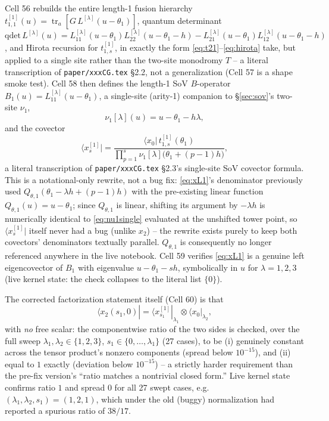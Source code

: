 \documentclass[11pt]{article}
\newcommand{\qthone}{Q_{\theta,1}}
\begin{document}
Cell 56 rebuilds the entire length-1 fusion hierarchy $t_{1,1}^{[1]}(u)=\operatorname{tr}_a[G\,
L^{[\lambda]}(u-\theta_1)]$, quantum determinant $\mathrm{qdet}\,L^{[\lambda]}(u) =
L^{[\lambda]}_{11}(u-\theta_1)L^{[\lambda]}_{22}(u-\theta_1-h) -
L^{[\lambda]}_{21}(u-\theta_1)L^{[\lambda]}_{12}(u-\theta_1-h)$, and Hirota recursion for
$t_{1,s}^{[1]}$, in exactly the form \eqref{eq:t21}--\eqref{eq:hirota} take, but applied to a single
site rather than the two-site monodromy $T$ -- a literal transcription of
\texttt{paper/xxxCG.tex} \S2.2, not a generalization (Cell 57 is a shape smoke test). Cell 58 then
defines the length-1 SoV $B$-operator $B_1(u)=L^{[\lambda]}_{11}(u-\theta_1)$, a single-site
(arity-1) companion to \S\ref{sec:sov}'s two-site $\nu_1$,
\begin{equation}
  \nu_1[\lambda](u) = u-\theta_1-h\lambda,
  \label{eq:nu1single}
\end{equation}
and the covector
\begin{equation}
  \langle x^{[1]}_s| = \frac{\langle x_0|\,t_{1,s}^{[1]}(\theta_1)}{\prod_{p=1}^{s}\nu_1[\lambda]\bigl(\theta_1+(p-1)h\bigr)},
  \label{eq:xL1}
\end{equation}
a literal transcription of \texttt{paper/xxxCG.tex} \S2.3's single-site SoV covector formula. This
is a notational-only rewrite, not a bug fix: \eqref{eq:xL1}'s denominator previously used
$\qthone(\theta_1-\lambda h+(p-1)h)$ with the pre-existing linear function $\qthone(u)=u-\theta_1$;
since $\qthone$ is linear, shifting its argument by $-\lambda h$ is numerically identical to
\eqref{eq:nu1single} evaluated at the unshifted tower point, so $\langle x^{[1]}_s|$ itself never had
a bug (unlike $x_2$) -- the rewrite exists purely to keep both covectors' denominators textually
parallel. $\qthone$ is consequently no longer referenced anywhere in the live notebook. Cell 59
verifies \eqref{eq:xL1} is a genuine left eigencovector of $B_1$ with eigenvalue $u-\theta_1-sh$,
symbolically in $u$ for $\lambda=1,2,3$ (live kernel state: the check collapses to the literal list
$\{0\}$).

The corrected factorization statement itself (Cell 60) is that
\begin{equation}
  \langle x_2(s_1,0)| = \langle x^{[1]}_{s_1}|_{\lambda_1}\otimes \langle x_0|_{\lambda_2},
  \label{eq:factorization}
\end{equation}
with \emph{no} free scalar: the componentwise ratio of the two sides is checked, over the full
sweep $\lambda_1,\lambda_2\in\{1,2,3\}$, $s_1\in\{0,\dots,\lambda_1\}$ (27 cases), to be (i)
genuinely constant across the tensor product's nonzero components (spread below $10^{-15}$), and
(ii) equal to $1$ exactly (deviation below $10^{-15}$) -- a strictly harder requirement than the
pre-fix version's ``ratio matches a nontrivial closed form.'' Live kernel state confirms ratio $1$
and spread $0$ for all 27 swept cases, e.g.\ $(\lambda_1,\lambda_2,s_1)=(1,2,1)$, which under the
old (buggy) normalization had reported a spurious ratio of $38/17$.
\end{document}
